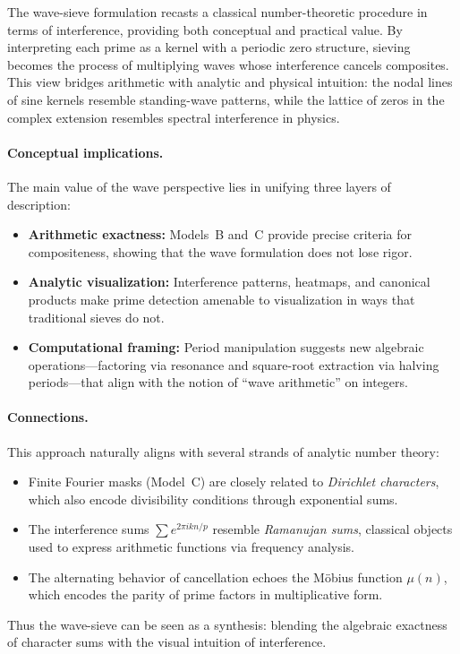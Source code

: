\documentclass[12pt]{article}
\theoremstyle{definition}
\theoremstyle{remark}
\begin{document}
The wave-sieve formulation recasts a classical number-theoretic procedure in terms of interference, providing both conceptual and practical value. By interpreting each prime as a kernel with a periodic zero structure, sieving becomes the process of multiplying waves whose interference cancels composites. This view bridges arithmetic with analytic and physical intuition: the nodal lines of sine kernels resemble standing-wave patterns, while the lattice of zeros in the complex extension resembles spectral interference in physics.  

\paragraph{Conceptual implications.}  
The main value of the wave perspective lies in unifying three layers of description:
\begin{itemize}
  \item \textbf{Arithmetic exactness:} Models~B and~C provide precise criteria for compositeness, showing that the wave formulation does not lose rigor.
  \item \textbf{Analytic visualization:} Interference patterns, heatmaps, and canonical products make prime detection amenable to visualization in ways that traditional sieves do not.
  \item \textbf{Computational framing:} Period manipulation suggests new algebraic operations—factoring via resonance and square-root extraction via halving periods—that align with the notion of ``wave arithmetic'' on integers.
\end{itemize}

\paragraph{Connections.}  
This approach naturally aligns with several strands of analytic number theory:
\begin{itemize}
  \item Finite Fourier masks (Model~C) are closely related to \emph{Dirichlet characters}, which also encode divisibility conditions through exponential sums.
  \item The interference sums $\sum e^{2\pi i kn/p}$ resemble \emph{Ramanujan sums}, classical objects used to express arithmetic functions via frequency analysis.
  \item The alternating behavior of cancellation echoes the Möbius function $\mu(n)$, which encodes the parity of prime factors in multiplicative form.
\end{itemize}
Thus the wave-sieve can be seen as a synthesis: blending the algebraic exactness of character sums with the visual intuition of interference.
\end{document}
